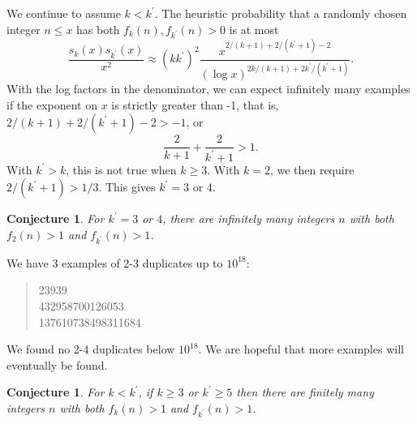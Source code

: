 \documentclass[11pt]{amsart}
\newcommand{\p}[1]{\left(#1\right)}
\newtheorem{conjecture}[thm]{Conjecture}
\numberwithin{equation}{section}
\numberwithin{algorithm}{section}
\begin{document}
We continue to assume $k<k^\prime$.
The heuristic probability that a randomly chosen integer $n\le x$
has both $f_k(n), f_{k^\prime}(n)>0$ is at most
$$
 \frac{s_k(x)s_{k^\prime}(x)}{x^2}
 \approx
 (kk^\prime)^2 \frac{x^{2/(k+1)+2/(k^\prime+1)-2}}{(\log x)^{2k/(k+1)+2k^\prime/(k^\prime+1)}} .
$$
With the log factors in the denominator, we can expect
infinitely many examples if the exponent on $x$ 
is strictly greater than -1, that is,
$2/(k+1)+2/(k^\prime+1)-2>-1$, or
$$\frac{2}{k+1}+\frac{2}{k^\prime+1}>1.$$
With $k^\prime>k$, this is not true when $k\ge 3$.
With $k=2$, we then require
$2/(k^\prime+1)>1/3$.
This gives $k^\prime=3$ or $4$.

\begin{conjecture}
    For $k^\prime=3$ or $4$,
    there are infinitely many integers $n$
    with both $f_2(n)>1$ and $f_{k^\prime}(n)>1$.
\end{conjecture}
We have 3 examples of 2-3 duplicates up to $10^{18}$:
\begin{quote}
    23939 \\
432958700126053 \\
137610738498311684
\end{quote}
We found no 2-4 duplicates below $10^{18}$.
We are hopeful that more examples will eventually be found.

\begin{conjecture}
   For $k<k^\prime$, 
   if $k\ge 3$ or $k^\prime\ge 5$ then
   there are finitely many integers $n$
   with both $f_k(n)>1$ and $f_{k^\prime}(n)>1$.
\end{conjecture}






\end{document}
